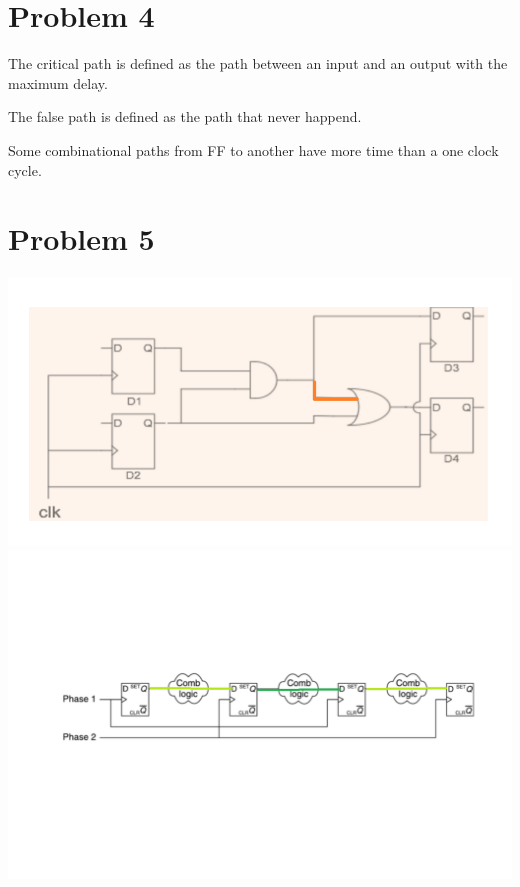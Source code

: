\documentclass[paper=a4, fontsize=11pt]{scrartcl} %
\numberwithin{equation}{section} %
\numberwithin{figure}{section} %
\numberwithin{table}{section} %
\begin{document}

\section{Problem 4}
\par The critical path is defined as the path between an input and an output with the maximum delay.
\par The false path is defined as the path that never happend.
\par Some combinational paths from FF to another have more time than a one clock cycle.


\section{Problem 5}
\center\includegraphics[]{p5-1.png}\\
\center\includegraphics[]{p5-2.png}\\
\end{document}
